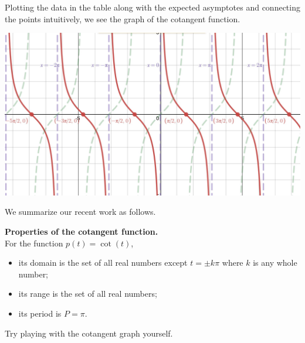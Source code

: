 \documentclass[nooutcomes, noauthor]{ximera}
\begin{document}
Plotting the data in the table along with the expected asymptotes and connecting the points intuitively, we see the graph of the cotangent function.

\begin{image}
\includegraphics[width=\textwidth]{cotangent.jpg}
\end{image}
We summarize our recent work as follows.

\begin{callout}
\textbf{Properties of the cotangent function.}\\
For the function \(p(t) = \cot(t)\),
\begin{itemize}[label=\textbullet]
\item
its domain is the set of all real numbers except \(t = \pm k\pi\) where \(k\) is any whole number;%
\item
its range is the set of all real numbers;
\item
its period is \(P = \pi\).%
\end{itemize}
\end{callout}

Try playing with the cotangent graph yourself.

\begin{center}  
\end{center} 
\end{document}
